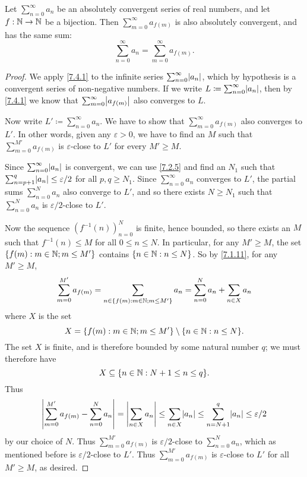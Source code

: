 \setcounter{thm}{2}
\begin{prop}\label{7.4.3}
  Let \(\sum_{n = 0}^\infty a_n\) be an absolutely convergent series of real numbers, and let \(f : \mathbb{N} \to \mathbb{N}\) be a bijection.
  Then \(\sum_{m = 0}^\infty a_{f(m)}\) is also absolutely convergent, and has the same sum:
  \[
    \sum_{n = 0}^\infty a_n = \sum_{m = 0}^\infty a_{f(m)}.
  \]
\end{prop}

\begin{proof}
  We apply \cref{7.4.1} to the infinite series \(\sum_{n = 0}^\infty \abs{a_n}\), which by hypothesis is a convergent series of non-negative numbers.
  If we write \(L \coloneqq \sum_{n = 0}^\infty \abs{a_n}\), then by \cref{7.4.1} we know that \(\sum_{m = 0}^\infty \abs{a_{f(m)}}\) also converges to \(L\).

  Now write \(L' \coloneqq \sum_{n = 0}^\infty a_n\).
  We have to show that \(\sum_{m = 0}^\infty a_{f(m)}\) also converges to \(L'\).
  In other words, given any \(\varepsilon > 0\), we have to find an \(M\) such that \(\sum_{m = 0}^{M'} a_{f(m)}\) is \(\varepsilon\)-close to \(L'\) for every \(M' \geq M\).

  Since \(\sum_{n = 0}^\infty \abs{a_n}\) is convergent, we can use \cref{7.2.5} and find an \(N_1\) such that \(\sum_{n = p + 1}^q \abs{a_n} \leq \varepsilon / 2\) for all \(p, q \geq N_1\).
  Since \(\sum_{n = 0}^\infty a_n\) converges to \(L'\), the partial sums \(\sum_{n = 0}^N a_n\) also converge to \(L'\), and so there exists \(N \geq N_1\) such that \(\sum_{n = 0}^N a_n\) is \(\varepsilon / 2\)-close to \(L'\).

  Now the sequence \((f^{-1}(n))_{n = 0}^N\) is finite, hence bounded, so there exists an \(M\) such that \(f^{-1}(n) \leq M\) for all \(0 \leq n \leq N\).
  In particular, for any \(M' \geq M\), the set \(\left\lbrace f(m) : m \in \mathbb{N}; m \leq M'\right\rbrace\) contains \(\left\lbrace n \in \mathbb{N} : n \leq N\right\rbrace\).
  So by \cref{7.1.11}, for any \(M' \geq M\),
  \[
    \sum_{m = 0}^{M'} a_{f(m)} = \sum_{n \in \left\lbrace f(m) : m \in \mathbb{N}; m \leq M'\right\rbrace} a_n = \sum_{n = 0}^N a_n + \sum_{n \in X} a_n
  \]
  where \(X\) is the set
  \[
    X = \set{f(m) : m \in \N; m \leq M'} \setminus \set{n \in \N : n \leq N}.
  \]
  The set \(X\) is finite, and is therefore bounded by some natural number \(q\);
  we must therefore have
  \[
    X \subseteq \set{n \in \N : N + 1 \leq n \leq q}.
  \]
  Thus
  \[
    \abs{\sum_{m = 0}^{M'} a_{f(m)} - \sum_{n = 0}^N a_n} = \abs{\sum_{n \in X} a_n} \leq \sum_{n \in X} \abs{a_n} \leq \sum_{n = N + 1}^q \abs{a_n} \leq \varepsilon / 2
  \]
  by our choice of \(N\).
  Thus \(\sum_{m = 0}^{M'} a_{f(m)}\) is \(\varepsilon / 2\)-close to \(\sum_{n = 0}^N a_n\), which as mentioned before is \(\varepsilon / 2\)-close to \(L'\).
  Thus \(\sum_{m = 0}^{M'} a_{f(m)}\) is \(\varepsilon\)-close to \(L'\) for all \(M' \geq M\), as desired.
\end{proof}

